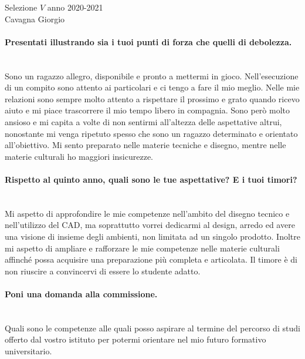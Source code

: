 \begin{center}
	\centering
	{\LARGE Selezione $V$ anno 2020-2021} \\
	\vspace{0.5cm}
	{\large Cavagna Giorgio}
	\vspace{0.5cm}
\end{center}


\paragraph{Presentati illustrando sia i tuoi punti di forza che quelli di debolezza.}~\\
Sono un ragazzo allegro, disponibile e pronto a mettermi in gioco. Nell'esecuzione di un compito sono attento ai particolari e ci tengo a fare il mio meglio. Nelle mie relazioni sono sempre molto attento a rispettare il prossimo e grato quando ricevo aiuto e mi piace trascorrere il mio tempo libero in compagnia. 
Sono però molto ansioso e mi capita a volte di non sentirmi all'altezza delle aspettative altrui, nonostante mi venga ripetuto spesso che sono un ragazzo determinato e orientato all'obiettivo. Mi sento preparato nelle materie tecniche e disegno, mentre nelle materie culturali ho maggiori insicurezze.

\paragraph{Rispetto al quinto anno, quali sono le tue aspettative? E i tuoi timori?}~\\
Mi aspetto di approfondire le mie competenze nell'ambito del disegno tecnico e nell'utilizzo del CAD, ma soprattutto vorrei dedicarmi al design, arredo ed avere una visione di insieme degli ambienti, non limitata ad un singolo prodotto. Inoltre mi aspetto di ampliare e rafforzare le mie competenze nelle materie culturali affinché possa acquisire una preparazione più completa e articolata. Il timore è di non riuscire a convincervi di essere lo studente adatto.



\paragraph{Poni una domanda alla commissione.}~\\
Quali sono le competenze alle quali posso aspirare al termine del percorso di studi offerto dal vostro istituto per potermi orientare nel mio futuro formativo universitario.\\




